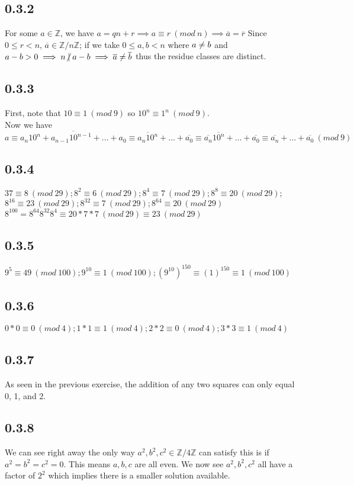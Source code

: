 \documentclass[11pt]{article}
\begin{document}
	\subsection*{0.3.2}
		For some $a \in \mathbb{Z}$, we have $a = qn + r \implies a \equiv r\ (mod\ n) \implies \overline{a} = \overline{r}$  Since $ 0\leq r < n$, $\overline{a} \in \mathbb{Z}/n\mathbb{Z}$; if we take $0 \leq a,b < n$ where $a \centernot = b$ and $a-b > 0 \implies n \centernot | a-b \implies \overline{a} \centernot = \overline{b}$ thus the residue classes are distinct.
	\subsection*{0.3.3}
		First, note that $10 \equiv 1\ (mod\ 9)$ so $10^n \equiv 1^n\ (mod\ 9)$.\\
		  Now we have $a \equiv \overline{a_n10^{n} + a_{n-1}10^{n-1} + \dots + a_0} \equiv \overline{a_n10^n} + \dots + \overline{a_0} \equiv \overline{a_n}\overline{10^n} + \dots + \overline{a_0} \equiv \overline{a_n} + \dots + \overline{a_0}\ (mod\ 9)$
	\subsection*{0.3.4}
		$37 \equiv 8\ (mod\ 29); 8^2 \equiv 6\ (mod\ 29); 8^4 \equiv 7\ (mod\ 29); 8^8 \equiv 20\ (mod\ 29);$\\
		$ 8^{16} \equiv 23\ (mod\ 29); 8^{32} \equiv 7\ (mod\ 29); 8^{64} \equiv 20\ (mod\ 29)$\\
		$8^{100} = 8^{64}8^{32}8^4 \equiv 20*7*7\ (mod\ 29) \equiv 23\ (mod\ 29)$
	\subsection*{0.3.5}
		$9^5 \equiv 49\ (mod\ 100); 9^{10} \equiv 1\ (mod\ 100); (9^{10})^{150} \equiv (1)^{150} \equiv 1\ (mod\ 100)$
	\subsection*{0.3.6}
		$0*0 \equiv 0\ (mod\ 4);1*1 \equiv 1\ (mod\ 4); 2*2 \equiv 0\ (mod\ 4); 3*3 \equiv 1\ (mod\ 4)$
	\subsection*{0.3.7}
		As seen in the previous exercise, the addition of any two squares can only equal 0, 1, and 2.
	\subsection*{0.3.8}
		We can see right away the only way $a^2, b^2, c^2 \in \mathbb{Z}/4\mathbb{Z}$  can satisfy this is if $a^2 = b^2 = c^2 = 0$.  This means $a, b, c$ are all even.  We now see $a^2, b^2, c^2$ all have a factor of $2^2$ which implies there is a smaller solution available.
\end{document}
